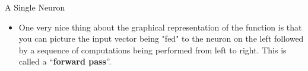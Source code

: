 \begin{frame} {A Single Neuron}
  \begin{itemize}
    \item \small{One very nice thing about the graphical representation of the function is that you can picture the input vector being "fed" to the neuron on the left followed by a sequence of computations being performed from left to right. This is called a \enquote{\textbf{forward pass}}}.
  \end{itemize}
  \begin{figure}
    \centering

\end{figure}
\end{frame}
